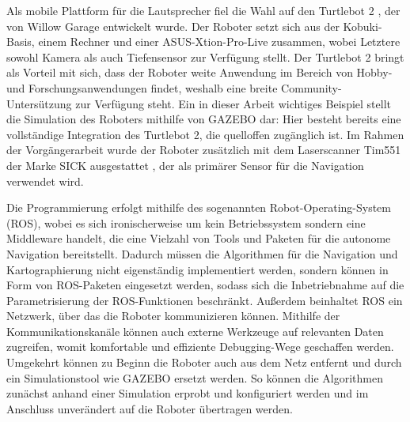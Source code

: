 Als mobile Plattform für die Lautsprecher fiel die Wahl auf den Turtlebot 2 \cite{Turtlebot}, der von Willow Garage entwickelt wurde. Der Roboter setzt sich aus der Kobuki-Basis, einem Rechner und einer ASUS-Xtion-Pro-Live zusammen, wobei Letztere sowohl Kamera als auch Tiefensensor zur Verfügung stellt. Der Turtlebot 2 bringt als Vorteil mit sich, dass der Roboter weite Anwendung im Bereich von Hobby- und Forschungsanwendungen findet, weshalb eine breite Community-Untersützung zur Verfügung steht. Ein in dieser Arbeit wichtiges Beispiel stellt die Simulation des Roboters mithilfe von GAZEBO \cite{gazebo} dar: Hier besteht bereits eine vollständige Integration des Turtlebot 2, die quelloffen zugänglich ist. Im Rahmen der Vorgängerarbeit wurde der Roboter zusätzlich mit dem Laserscanner Tim551 der Marke SICK ausgestattet \cite{SICK}, der als primärer Sensor für die Navigation verwendet wird.

Die Programmierung erfolgt mithilfe des sogenannten Robot-Operating-System (ROS), wobei es sich ironischerweise um kein Betriebssystem sondern eine Middleware handelt, die eine Vielzahl von Tools und Paketen für die autonome Navigation bereitstellt. Dadurch müssen die Algorithmen für die Navigation und Kartographierung nicht eigenständig implementiert werden, sondern können in Form von ROS-Paketen eingesetzt werden, sodass sich die Inbetriebnahme auf die Parametrisierung der ROS-Funktionen beschränkt. Außerdem beinhaltet ROS ein Netzwerk, über das die Roboter kommunizieren können. Mithilfe der Kommunikationskanäle können auch externe Werkzeuge auf relevanten Daten zugreifen, womit komfortable und effiziente Debugging-Wege geschaffen werden. Umgekehrt können zu Beginn die Roboter auch aus dem Netz entfernt und durch ein Simulationstool wie GAZEBO ersetzt werden. So können die Algorithmen zunächst anhand einer Simulation erprobt und konfiguriert werden und im Anschluss unverändert auf die Roboter übertragen werden.

